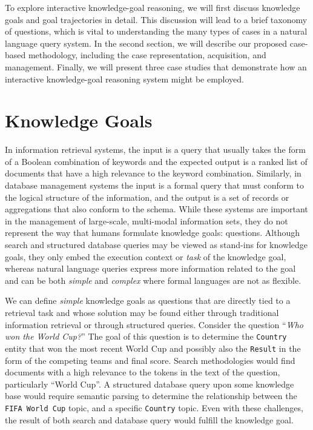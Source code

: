 \documentclass[11pt,letterpaper]{article}
\begin{document}
To explore interactive knowledge-goal reasoning, we will first discuss knowledge goals and goal trajectories in detail. This discussion will lead to a brief taxonomy of questions, which is vital to understanding the many types of cases in a natural language query system. In the second section, we will describe our proposed case-based methodology, including the case representation, acquisition, and management. Finally, we will present three case studies that demonstrate how an interactive knowledge-goal reasoning system might be employed.

\section{Knowledge Goals}

In information retrieval systems, the input is a query that usually takes the form of a Boolean combination of keywords and the expected output is a ranked list of documents that have a high relevance to the keyword combination. Similarly, in database management systems the input is a formal query that must conform to the logical structure of the information, and the output is a set of records or aggregations that also conform to the schema. While these systems are important in the management of large-scale, multi-modal information sets, they do not represent the way that humans formulate knowledge goals: questions. Although search and structured database queries may be viewed as stand-ins for knowledge goals, they only embed the execution context or \textit{task} of the knowledge goal, whereas natural language queries express more information related to the goal and can be both \textit{simple} and \textit{complex} where formal languages are not as flexible.

We can define \textit{simple} knowledge goals as questions that are directly tied to a retrieval task and whose solution may be found either through traditional information retrieval or through structured queries. Consider the question ``\textit{Who won the World Cup?}'' The goal of this question is to determine the \texttt{Country} entity that won the most recent World Cup and possibly also the \texttt{Result} in the form of the competing teams and final score. Search methodologies would find documents with a high relevance to the tokens in the text of the question, particularly ``World Cup''. A structured database query upon some knowledge base would require semantic parsing to determine the relationship between the \texttt{FIFA World Cup} topic, and a specific \texttt{Country} topic. Even with these challenges, the result of both search and database query would fulfill the knowledge goal.
\end{document}

